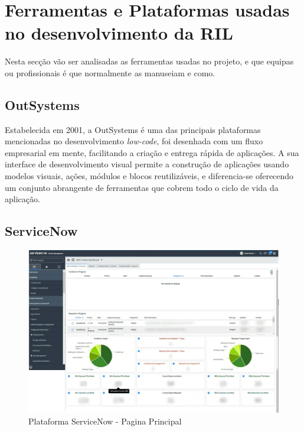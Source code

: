 \section{Ferramentas e Plataformas usadas no desenvolvimento da RIL}

    Nesta secção vão ser analisadas as ferramentas usadas no projeto, e que equipas ou profissionais é que normalmente as manuseiam e como.

    \subsection{OutSystems}\label{sec:outsystems}
    
        Estabelecida em 2001, a OutSystems é uma das principais plataformas mencionadas no desenvolvimento \textit{low-code}, foi desenhada com um fluxo empresarial em mente, facilitando a criação e entrega rápida de aplicações. A sua interface de desenvolvimento visual permite a construção de aplicações usando modelos visuais, ações, módulos e blocos reutilizáveis, e diferencia-se oferecendo um conjunto abrangente de ferramentas que cobrem todo o ciclo de vida da aplicação\cite{os-vision}.
                    

        

        

    \subsection{ServiceNow}\label{sec:service-now}

        \begin{figure}[htbp]
            \centering
            \includegraphics[width=\textwidth]{imgs/ServiceNow.png} %
            \caption[Plataforma ServiceNow - Pagina Principal]{Plataforma ServiceNow - Pagina Principal\protect\footnotemark}\label{fig:service-ui}
        \end{figure}

